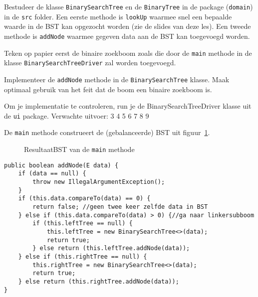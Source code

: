 \begin{oef}
\papier \code Bestudeer de klasse \verb=BinarySearchTree= en de \verb=BinaryTree= in de package (\verb=domain=) in de \verb=src= folder.
 Een eerste  methode is \verb=lookUp= waarmee snel een bepaalde waarde in de BST kan opgezocht worden (zie de slides van deze les). Een tweede methode is \verb=addNode= waarmee gegeven data aan de BST kan toegevoegd worden.

\begin{oefenumerate}
\item Teken op papier eerst de binaire zoekboom zoals die door de \verb+main+ methode in de klasse \verb+BinarySearchTreeDriver+ zal worden toegevoegd.
\item Implementeer de \verb=addNode= methode in de \verb=BinarySearchTree= klasse.  Maak optimaal gebruik van het feit dat de boom een binaire zoekboom is.
\item Om je implementatie te controleren, run je de BinarySearchTreeDriver klasse uit de \verb+ui+ package. Verwachte uitvoer: 3 4 5 6 7 8 9  
\end{oefenumerate}
\begin{opl}
De \verb+main+ methode construeert de (gebalanceerde) BST uit figuur~\ref{fig:oefBSTmain}.
\begin{figure}[htbp]
    \centering
{}
\cprotect\caption{ResultaatBST van de \verb+main+ methode}
    \label{fig:oefBSTmain}
\end{figure}
\begin{lstlisting}[caption={addNode(data) methode}, label=bstaddnode]
public boolean addNode(E data) {
	if (data == null) {
		throw new IllegalArgumentException();
	}
	if (this.data.compareTo(data) == 0) {
		return false; //geen twee keer zelfde data in BST
	} else if (this.data.compareTo(data) > 0) {//ga naar linkersubboom
		if (this.leftTree == null) {
			this.leftTree = new BinarySearchTree<>(data);
			return true;
		} else return (this.leftTree.addNode(data));
	} else if (this.rightTree == null) {
		this.rightTree = new BinarySearchTree<>(data);
		return true;
	} else return (this.rightTree.addNode(data));
}
\end{lstlisting}

\end{opl}
\end{oef}


